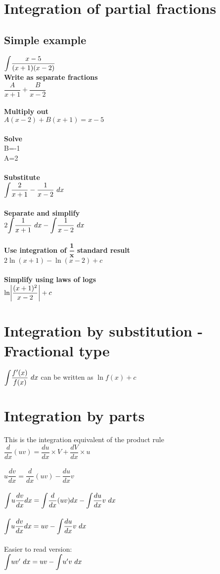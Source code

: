 \documentclass{article}[18pt]
\DeclarePairedDelimiter\abs{\lvert}{\rvert}
\begin{document}
\section{Integration of partial fractions}
\subsection{Simple example}
$\mathlarger{\int}\dfrac{x-5}{(x+1)(x-2)}$\\
\textbf{Write as separate fractions}\\
$\dfrac{A}{x+1}+\dfrac{B}{x-2}$\\
\\
\textbf{Multiply out}\\
$A(x-2)+B(x+1)=x-5$\\
\\
\textbf{Solve}\\
B=-1\\
A=2\\
\\
\textbf{Substitute}\\
$\mathlarger{\int}\dfrac{2}{x+1}-\dfrac{1}{x-2} \ dx$\\
\\
\textbf{Separate and simplify}\\
$2\mathlarger{\int}\dfrac{1}{x+1} \ dx-\mathlarger{\int}\dfrac{1}{x-2} \ dx$\\
\\
\textbf{Use integration of $\mathbf{\dfrac{1}{x}}$ standard result}\\
$2\ln(x+1)-\ln(x-2)+c$\\
\\
\textbf{Simplify using laws of logs}\\
$\ln\abs*{\dfrac{(x+1)^2}{x-2}}+c$
\section{Integration by substitution - Fractional type}
$\mathlarger{\int}\dfrac{f'(x)}{f(x)} \ dx$ can be written as $\ln f(x)+c$\\
\section{Integration by parts}
This is the integration equivalent of the product rule\\
$\dfrac{d}{dx}(uv)=\dfrac{du}{dx}\times V+\dfrac{dV}{dx}\times u$\\
\\
$u\dfrac{dv}{dx}=\dfrac{d}{dx}(uv)-\dfrac{du}{dx}v$\\
\\
$\mathlarger{\int}u\dfrac{dv}{dx}dx=\mathlarger{\int}\dfrac{d}{dx}(uv)dx-\mathlarger{\int}\dfrac{du}{dx}v \ dx$\\
\\
$\mathlarger{\int}u\dfrac{dv}{dx}dx=uv-\mathlarger{\int}\dfrac{du}{dx}v \ dx$\\
\\
Easier to read version:\\
$\mathlarger{\int}uv' \ dx=uv-\mathlarger{\int}u'v \ dx$
\newpage
\end{document}
